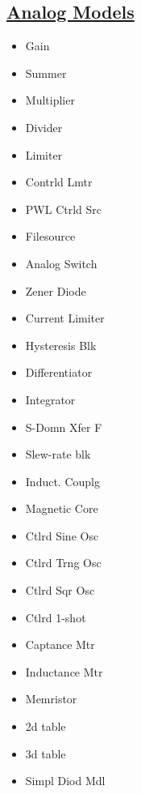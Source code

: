 \subsection*{\href{https://sourceforge.net/p/ngspice/ngspice/ci/master/tree/src/xspice/icm/analog/}{Analog Models}}
{\footnotesize
\begin{multicols}{3}\begin{itemize}[label={},leftmargin=0pt]
    \item Gain
    \item Summer
    \item Multiplier
    \item Divider
    \item Limiter
    \item Contrl\textquotesingle d Lmtr
    \item PWL Ctrl\textquotesingle d Src
    \item Filesource
    \item Analog Switch
    \item Zener Diode
    \item Current Limiter
    \item Hysteresis Blk
    \item Differentiator
    \item Integrator
    \item S-Domn Xfer F
    \item Slew-rate blk
    \item Induct. Coupl\textquotesingle g
    \item Magnetic Core
    \item Ctlrd Sine Osc
    \item Ctlrd Trng Osc 
    \item Ctlrd Sqr Osc
    \item Ctlrd 1-shot
    \item Cap\textquotesingle tance Mtr
    \item Inductance Mtr
    \item Memristor
    \item 2d table
    \item 3d table
    \item Simpl Diod Mdl
    \end{itemize}\end{multicols}
}


